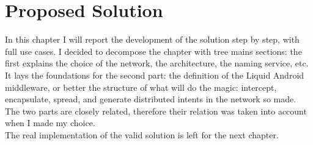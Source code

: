 %
%
\chapter{Proposed Solution}
%
\label{cap:proposedsolution}
%
%
\par In this chapter I will report the development of the solution step by step, with full use cases. %
 I decided to decompose the chapter with tree mains sections: the first explains the choice of the network, the architecture, the naming service, etc. It lays the foundations for the second part: the definition of the Liquid Android middleware, or better the structure of what will do the magic: intercept, encapsulate, spread, and generate distributed intents in the network so made. The two parts are closely related, therefore their relation was taken into account when I made my choice.\\
The real implementation of the valid solution is left for the next chapter.
%
